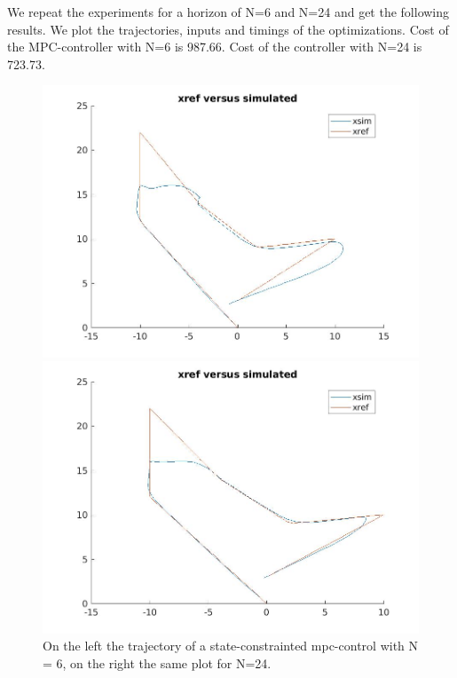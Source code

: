 \documentclass[•]{article}
\begin{document}
We repeat the experiments for a horizon of N=6 and N=24 and get the following results. We plot the trajectories, inputs and timings of the optimizations. Cost of the MPC-controller with N=6 is 987.66. Cost of the controller with N=24 is 723.73.

\begin{figure}[H]
\begin{minipage}{.45\textwidth}
\includegraphics[width = \textwidth]{mpctrajssconstr6.jpg}
\end{minipage}
\begin{minipage}{.45\textwidth}
\includegraphics[width = \textwidth]{mpctrajssconstr24.jpg}
\end{minipage}
\caption{On the left the trajectory of a state-constrainted mpc-control with N = 6, on the right the same plot for N=24.}
\end{figure}
\end{document}
